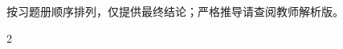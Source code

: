 \newif\ifteacher
\teacherfalse

\renewcommand{\EditionName}{答案速查}

\noindent\textcolor{muted}{按习题册顺序排列，仅提供最终结论；严格推导请查阅教师解析版。}
\medskip
\begingroup\setlength{\columnsep}{8mm}\sloppy\begin{multicols}{2}

\end{multicols}\endgroup

